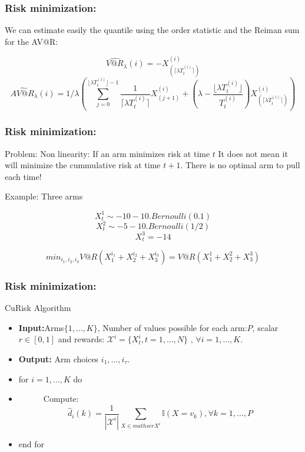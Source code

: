 \documentclass[english]{beamer}
\begin{document}
\begin{frame}
\frametitle{Risk minimization:}

We can estimate easily the quantile using the order statistic and the Reiman sum for the AV@R:

$$\widehat{V@R}_{\lambda}(i)=-X_{(\lceil \lambda T_t^{(i)} \rceil)}^{(i)}$$
$$\widehat{AV@R}_{\lambda}(i)=1/\lambda(\sum_{j=0}^{\lfloor \lambda T_t^{(i)}\rfloor-1}\frac{1}{\lceil \lambda T_t^{(i)} \rceil}X^{(i)}_{(j+1)}+(\lambda-\frac{\lfloor \lambda T_t^{(i)}\rfloor}{ T_t^{(i)}})X^{(i)}_{(\lceil \lambda T_t^{(i)} \rceil)})$$
\end{frame}

\begin{frame}
\frametitle{Risk minimization:}

Problem: Non linearity: If an arm minimizes risk at time $t$ It does not mean it will minimize the cummulative risk at time $t+1$. There is no optimal arm to pull each time!

Example: Three arms

$$X^1_t \sim -10-10.Bernoulli(0.1)$$
$$X^2_t \sim -5-10.Bernoulli(1/2)$$
$$X^3_t=-14$$

$$min_{i_1,i_2,i_3} V@R(X^{i_1}_1+X^{i_2}_2+X^{i_3}_3)=V@R(X^{1}_1+X^{2}_2+X^{3}_3)$$

\end{frame}

\begin{frame}
\frametitle{Risk minimization:}

\begin{block}{CuRisk Algorithm}

\begin{itemize}
\item[1:\ ] \textbf{Input:}Arms$\{1,\dots,K\}$, Number of values possible for each arm:$P$, scalar $r \in [0,1]$ and rewards: $\mathscr{X}^i=\{X^i_t,t=1,\dots,N\} \text{\ , \ } \forall i=1,\dots,K$.
\item[2: \ ] \textbf{Output:} Arm choices $i_1,\dots,i_{\tau}$.
\item[3: \ ] for $i=1,\dots,K$ do
\item[4: \ ] \ \ \ \ \ \ Compute:$$\hat{d}_i(k)=\frac{1}{|\mathscr{X}^i|}\sum_{X \in mathscr{X}^i} \mathbb{I}(X=v_k), \forall k =1,\dots,P$$
\item[5: \ ] end for
\end{itemize}

\end{block}
\end{frame}
\end{document}
